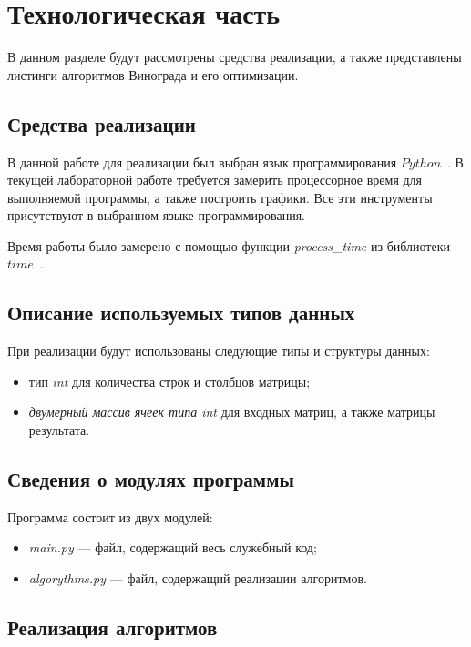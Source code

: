 \chapter{Технологическая часть}

В данном разделе будут рассмотрены средства реализации, а также представлены листинги алгоритмов Винограда и его оптимизации.

\section{Средства реализации}

В данной работе для реализации был выбран язык программирования $Python$~\cite{python-lang}. В текущей лабораторной работе требуется замерить процессорное время для выполняемой программы, а также построить графики. Все эти инструменты присутствуют в выбранном языке программирования.

Время работы было замерено с помощью функции \textit{process\_time} из библиотеки $time$~\cite{python-lang-time}.

\section{Описание используемых типов данных}

При реализации будут использованы следующие типы и структуры данных:

\begin{itemize}[label=---]
	\item тип \textit{int} для количества строк и столбцов матрицы;
	\item \textit{двумерный массив ячеек типа int} для входных матриц, а также матрицы результата.
\end{itemize}

\section{Сведения о модулях программы}

Программа состоит из двух модулей:

\begin{itemize}[label={---}]
	\item \textit{main.py} --- файл, содержащий весь служебный код;
	\item \textit{algorythms.py} --- файл, содержащий реализации алгоритмов.
\end{itemize}

\section{Реализация алгоритмов}

